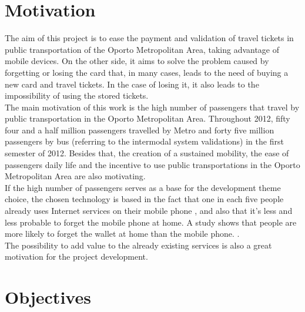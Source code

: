 \documentclass[9pt,a4paper]{extarticle}
\begin{document}
\begin{multicols}{2}

\section{Motivation}\label{sec:motiva}

The aim of this project is to ease the payment and validation of travel tickets in public transportation of the Oporto Metropolitan Area, taking advantage of mobile devices. On the other side, it aims to solve the problem caused by forgetting or losing the card that, in many cases, leads to the need of buying a new card and travel tickets. In the case of losing it, it also leads to the impossibility of using the stored tickets.
\\The main motivation of this work is the high number of passengers that travel by public transportation in the Oporto Metropolitan Area. Throughout 2012, fifty four and a half million passengers travelled by Metro \cite{INE20130528} and forty five million passengers by bus (referring to the intermodal system validations) in the first semester of 2012. \cite{andante} Besides that, the creation of a sustained mobility, the ease of passengers daily life and the incentive to use public transportations in the Oporto Metropolitan Area are also motivating.
\\If the high number of passengers serves as a base for the development theme choice, the chosen technology is based in the fact that one in each five people already uses Internet services on their mobile phone \cite{INE20121106}, and also that it’s less and less probable to forget the mobile phone at home. A study shows that people are more likely to forget the wallet at home than the mobile phone. \cite{NFCForum2011}.
\\The possibility to add value to the already existing services is also a great motivation for the project development.

\section{Objectives}\label{sec:goals}


\end{multicols}
\end{document}
